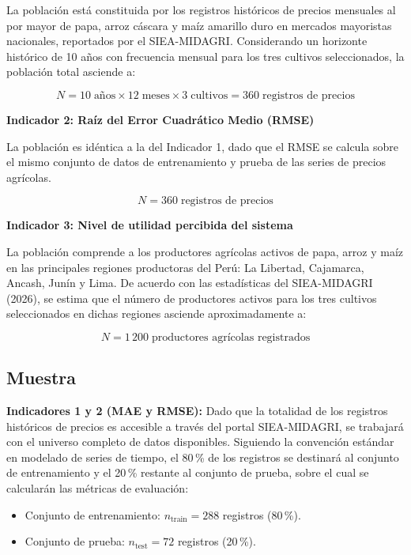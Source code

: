 \documentclass[12pt, a4paper]{report}
\begin{document}
La población está constituida por los registros históricos de precios mensuales al por mayor de papa, arroz cáscara y maíz amarillo duro en mercados mayoristas nacionales, reportados por el SIEA-MIDAGRI. Considerando un horizonte histórico de 10 años con frecuencia mensual para los tres cultivos seleccionados, la población total asciende a:

\begin{equation}
  N = 10 \;\text{años} \times 12 \;\text{meses} \times 3 \;\text{cultivos} = 360 \;\text{registros de precios}
\end{equation}

\textbf{Indicador 2: Raíz del Error Cuadrático Medio (RMSE)}

La población es idéntica a la del Indicador 1, dado que el RMSE se calcula sobre el mismo conjunto de datos de entrenamiento y prueba de las series de precios agrícolas.

\begin{equation}
  N = 360 \;\text{registros de precios}
\end{equation}

\textbf{Indicador 3: Nivel de utilidad percibida del sistema}

La población comprende a los productores agrícolas activos de papa, arroz y maíz en las principales regiones productoras del Perú: La Libertad, Cajamarca, Ancash, Junín y Lima. De acuerdo con las estadísticas del SIEA-MIDAGRI (2026), se estima que el número de productores activos para los tres cultivos seleccionados en dichas regiones asciende aproximadamente a:

\begin{equation}
  N = 1\,200 \;\text{productores agrícolas registrados}
\end{equation}

\subsection{Muestra}

\textbf{Indicadores 1 y 2 (MAE y RMSE):} Dado que la totalidad de los registros históricos de precios es accesible a través del portal SIEA-MIDAGRI, se trabajará con el universo completo de datos disponibles. Siguiendo la convención estándar en modelado de series de tiempo, el 80\,\% de los registros se destinará al conjunto de entrenamiento y el 20\,\% restante al conjunto de prueba, sobre el cual se calcularán las métricas de evaluación:

\begin{itemize}
  \item Conjunto de entrenamiento: $n_{\text{train}} = 288$ registros (80\,\%).
  \item Conjunto de prueba: $n_{\text{test}} = 72$ registros (20\,\%).
\end{itemize}
\end{document}
